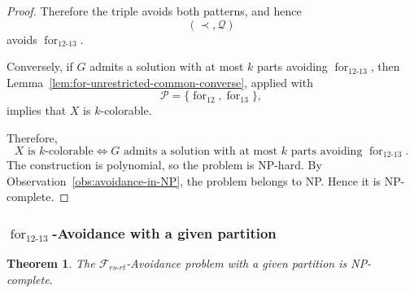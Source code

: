 \documentclass[12pt]{article}
\theoremstyle{plain}
\newtheorem{theorem}{Theorem}[section]
\theoremstyle{definition}
\theoremstyle{remark}
\theoremstyle{definition}
\newcommand{\forlabel}{\mathrm{for}}
\DeclareRobustCommand{\forparam}[1]{%
  \ensuremath{\mathop{\forlabel}\nolimits_{#1}}%
}
\begin{document}
\begin{proof}
Therefore the triple avoids both patterns, and hence
\[
(\prec,\mathcal Q)
\]
avoids \(\forparam{12\text{-}13}\).

Conversely, if \(G\) admits a solution with at most \(k\) parts
avoiding \(\forparam{12\text{-}13}\), then
Lemma~\ref{lem:for-unrestricted-common-converse}, applied with
\[
\mathcal P=\{\forparam{12},\forparam{13}\},
\]
implies that \(X\) is \(k\)-colorable.

Therefore,
\[
X\text{ is \(k\)-colorable}
\iff
G\text{ admits a solution with at most \(k\) parts avoiding }
\forparam{12\text{-}13}.
\]
The construction is polynomial, so the problem is NP-hard.
By Observation~\ref{obs:avoidance-in-NP}, the problem belongs to NP.
Hence it is NP-complete.
\end{proof}





\subsubsection{
\texorpdfstring{\(\forparam{12\text{-}13}\)-Avoidance with a given partition}
{for12-13-Avoidance with a given partition}
}
\label{subsubsec:for12-13-given-partition}




\begin{theorem}\label{thm:forrs-rt-given-partition-np-complete}
The \(\mathcal F_{rs\text{-}rt}\)-Avoidance problem with a given partition is NP-complete.
\end{theorem}
\end{document}
